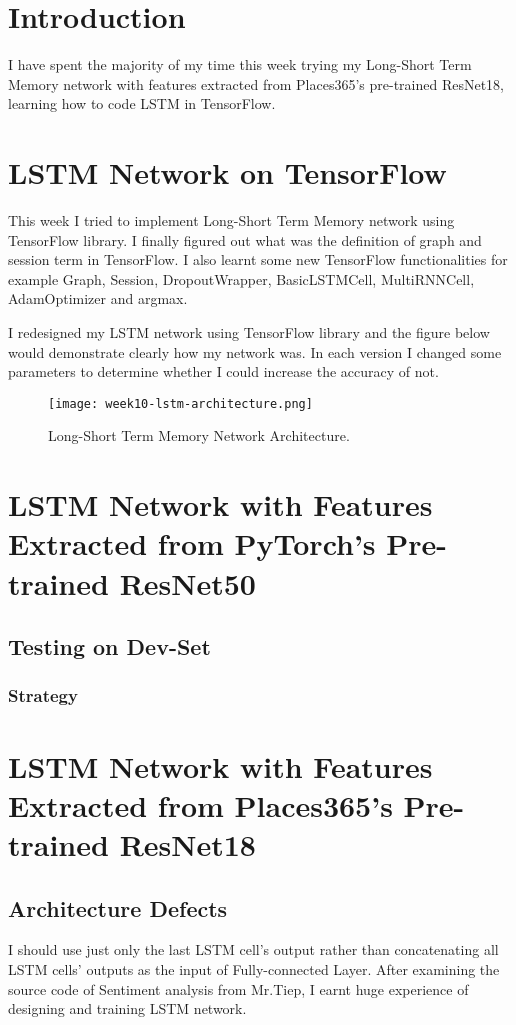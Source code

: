 \section{Introduction}
I have spent the majority of my time this week trying my Long-Short Term Memory network with features extracted from Places365's pre-trained ResNet18, learning how to code LSTM in TensorFlow.

\section{LSTM Network on TensorFlow}
This week I tried to implement Long-Short Term Memory network using TensorFlow library. I finally figured out what was the definition of graph and session term in TensorFlow. I also learnt some new TensorFlow functionalities for example Graph, Session, DropoutWrapper, BasicLSTMCell, MultiRNNCell, AdamOptimizer and argmax.

I redesigned my LSTM network using TensorFlow library and the figure below would demonstrate clearly how my network was. In each version I changed some parameters to determine whether I could increase the accuracy of not.

\begin{figure}[!ht]
\centering
\texttt{[image: week10-lstm-architecture.png]}
\caption{Long-Short Term Memory Network Architecture.}
\end{figure}

\section{LSTM Network with Features Extracted from PyTorch's Pre-trained ResNet50}
\subsection{Testing on Dev-Set}
\subsubsection{Strategy}


\section{LSTM Network with Features Extracted from Places365's Pre-trained ResNet18}
\subsection{Architecture Defects}
I should use just only the last LSTM cell's output rather than concatenating all LSTM cells' outputs as the input of Fully-connected Layer. After examining the source code of Sentiment analysis from Mr.Tiep, I earnt huge experience of designing and training LSTM network.

